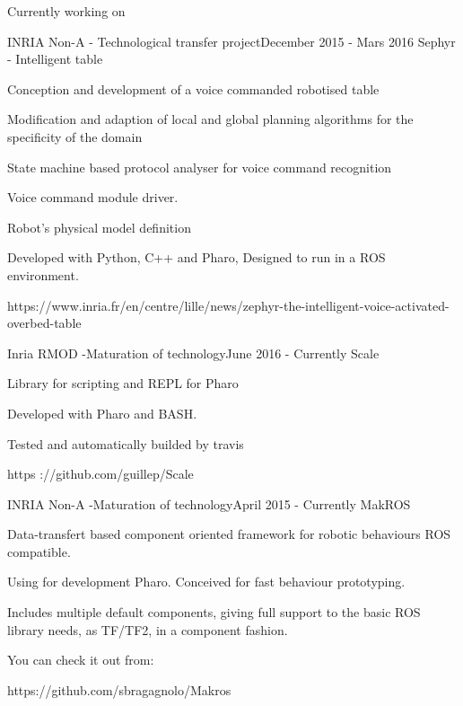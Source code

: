 \documentclass{resume} %
\begin{document}
\begin{rSection}{Currently working on}
	\begin{rSubsection}{INRIA Non-A - Technological transfer project}{December 2015 - Mars 2016 }{Sephyr - Intelligent table }
		\item 
		\item Conception and development of a voice commanded robotised table
		\item Modification and adaption of local and global planning algorithms for the specificity of the domain 
		\item State machine based protocol analyser for voice command recognition 
		\item Voice command module driver.
		\item Robot's physical model definition 
		\item Developed with Python, C++ and Pharo, Designed to run in a ROS environment. 
		\item https://www.inria.fr/en/centre/lille/news/zephyr-the-intelligent-voice-activated-overbed-table
	\end{rSubsection}
	
	
	\begin{rSubsection}{Inria RMOD -Maturation of technology}{June 2016 - Currently }{Scale}
		\item 
		\item Library for scripting and REPL for Pharo
		\item Developed with Pharo and BASH. 
		\item Tested and automatically builded by travis
		\item https ://github.com/guillep/Scale		
	\end{rSubsection}
	
	\begin{rSubsection}{INRIA Non-A -Maturation of technology}{April 2015 - Currently }{MakROS}
		\item Data-transfert based component oriented framework for robotic behaviours ROS compatible. 
		\item Using for development Pharo. Conceived for fast behaviour prototyping.
		\item Includes multiple default components, giving full support to the basic ROS library needs, as TF/TF2, in a component fashion.
		\item You can check it out from: 
		\item https://github.com/sbragagnolo/Makros
	\end{rSubsection}
	

\end{rSection}
\end{document}
